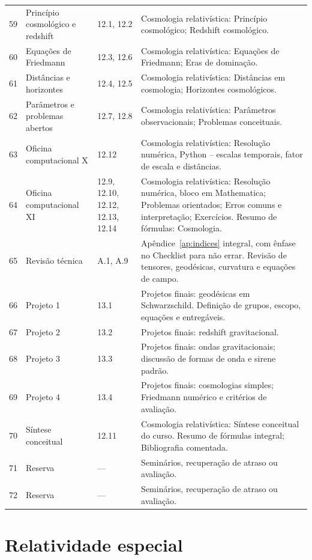 \documentclass[12pt,a4paper,oneside]{book}
\theoremstyle{rgplain}
\theoremstyle{rgremark}
\begin{document}
\begin{longtable}{cp{3.3cm}p{2.3cm}p{6.1cm}}
59 & Princípio cosmológico e redshift & 12.1, 12.2 & Cosmologia relativística: Princípio cosmológico; Redshift cosmológico. \\
60 & Equações de Friedmann & 12.3, 12.6 & Cosmologia relativística: Equações de Friedmann; Eras de dominação. \\
61 & Distâncias e horizontes & 12.4, 12.5 & Cosmologia relativística: Distâncias em cosmologia; Horizontes cosmológicos. \\
62 & Parâmetros e problemas abertos & 12.7, 12.8 & Cosmologia relativística: Parâmetros observacionais; Problemas conceituais. \\
63 & Oficina computacional X & 12.12 & Cosmologia relativística: Resolução numérica, Python -- escalas temporais, fator de escala e distâncias. \\
64 & Oficina computacional XI & 12.9, 12.10, 12.12, 12.13, 12.14 & Cosmologia relativística: Resolução numérica, bloco em Mathematica; Problemas orientados; Erros comuns e interpretação; Exercícios. Resumo de fórmulas: Cosmologia. \\
65 & Revisão técnica & A.1, A.9 & Apêndice~\ref{ap:indices} integral, com ênfase no Checklist para não errar. Revisão de tensores, geodésicas, curvatura e equações de campo. \\
66 & Projeto 1 & 13.1 & Projetos finais: geodésicas em Schwarzschild. Definição de grupos, escopo, equações e entregáveis. \\
67 & Projeto 2 & 13.2 & Projetos finais: redshift gravitacional. \\
68 & Projeto 3 & 13.3 & Projetos finais: ondas gravitacionais; discussão de formas de onda e sirene padrão. \\
69 & Projeto 4 & 13.4 & Projetos finais: cosmologias simples; Friedmann numérico e critérios de avaliação. \\
70 & Síntese conceitual & 12.11 & Cosmologia relativística: Síntese conceitual do curso. Resumo de fórmulas integral; Bibliografia comentada. \\
71 & Reserva & --- & Seminários, recuperação de atraso ou avaliação. \\
72 & Reserva & --- & Seminários, recuperação de atraso ou avaliação. \\
\bottomrule
\end{longtable}
\normalsize

\chapter{Relatividade especial}
\label{chap:relatividade-especial}
\end{document}
